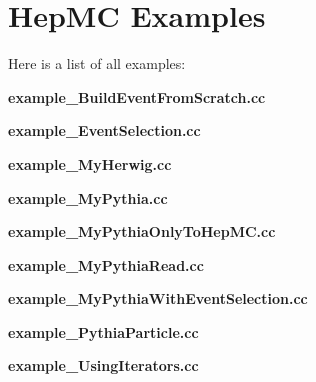 \section{Hep\-MC Examples}
Here is a list of all examples:\begin{CompactItemize}
\item 
{\bf example\_\-Build\-Event\-From\-Scratch.cc}
\item 
{\bf example\_\-Event\-Selection.cc}
\item 
{\bf example\_\-My\-Herwig.cc}
\item 
{\bf example\_\-My\-Pythia.cc}
\item 
{\bf example\_\-My\-Pythia\-Only\-To\-Hep\-MC.cc}
\item 
{\bf example\_\-My\-Pythia\-Read.cc}
\item 
{\bf example\_\-My\-Pythia\-With\-Event\-Selection.cc}
\item 
{\bf example\_\-Pythia\-Particle.cc}
\item 
{\bf example\_\-Using\-Iterators.cc}
\end{CompactItemize}
